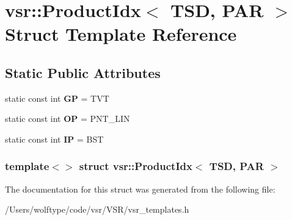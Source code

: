 \hypertarget{structvsr_1_1_product_idx_3_01_t_s_d_00_01_p_a_r_01_4}{\section{vsr\-:\-:Product\-Idx$<$ T\-S\-D, P\-A\-R $>$ Struct Template Reference}
\label{structvsr_1_1_product_idx_3_01_t_s_d_00_01_p_a_r_01_4}
}
\subsection*{Static Public Attributes}
\begin{DoxyCompactItemize}
\item 
\hypertarget{structvsr_1_1_product_idx_3_01_t_s_d_00_01_p_a_r_01_4_ab2dac834c4dc123383f19546f061f0d4}{static const int {\bfseries G\-P} = T\-V\-T}\label{structvsr_1_1_product_idx_3_01_t_s_d_00_01_p_a_r_01_4_ab2dac834c4dc123383f19546f061f0d4}

\item 
\hypertarget{structvsr_1_1_product_idx_3_01_t_s_d_00_01_p_a_r_01_4_aff4b3e42aa90b24b4d4b07a389b82b4a}{static const int {\bfseries O\-P} = P\-N\-T\-\_\-\-L\-I\-N}\label{structvsr_1_1_product_idx_3_01_t_s_d_00_01_p_a_r_01_4_aff4b3e42aa90b24b4d4b07a389b82b4a}

\item 
\hypertarget{structvsr_1_1_product_idx_3_01_t_s_d_00_01_p_a_r_01_4_aee3cec20f1e02b4c5cfb7cdbc07837a7}{static const int {\bfseries I\-P} = B\-S\-T}\label{structvsr_1_1_product_idx_3_01_t_s_d_00_01_p_a_r_01_4_aee3cec20f1e02b4c5cfb7cdbc07837a7}

\end{DoxyCompactItemize}
\subsubsection*{template$<$$>$ struct vsr\-::\-Product\-Idx$<$ T\-S\-D, P\-A\-R $>$}



The documentation for this struct was generated from the following file\-:\begin{DoxyCompactItemize}
\item 
/\-Users/wolftype/code/vsr/\-V\-S\-R/vsr\-\_\-templates.\-h\end{DoxyCompactItemize}

